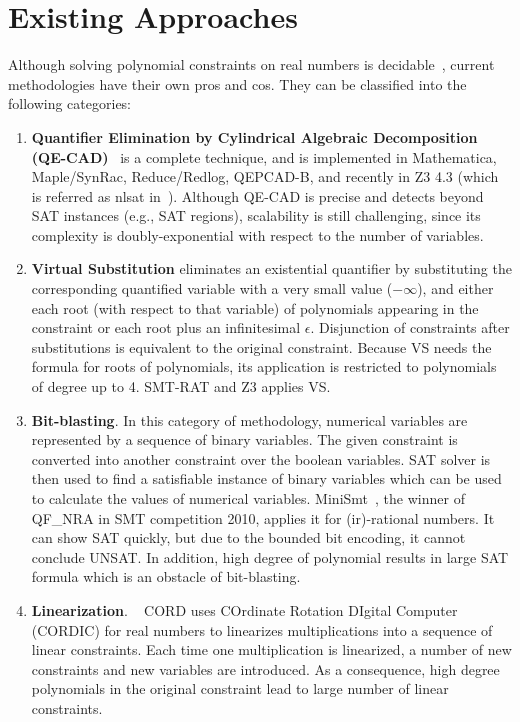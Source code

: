 \section{Existing Approaches}
Although solving polynomial constraints on real numbers is decidable~\cite{tarski}, current methodologies have their own pros and cos. They can be classified into the following categories: 
\begin{enumerate}
\item \textbf{Quantifier Elimination by Cylindrical Algebraic Decomposition (QE-CAD)}~\cite{qecad} 
is a complete technique, and 
is implemented in Mathematica, Maple/SynRac, Reduce/Redlog, QEPCAD-B, and recently 
in
Z3 4.3 (which is referred as nlsat in~\cite{Jovanovic13}).
Although QE-CAD is precise and detects beyond SAT instances (e.g., SAT regions), 
scalability is still challenging, since its complexity is doubly-exponential with respect to the number of variables. 

\item \textbf{Virtual Substitution } eliminates an existential quantifier by substituting the corresponding quantified variable with a very small value ($-\infty$), and either each root (with respect to that variable) of polynomials appearing in the constraint or each root plus an infinitesimal $\epsilon$. Disjunction of constraints after substitutions is equivalent to the original constraint. Because VS needs the formula for roots of polynomials, its application is restricted to polynomials of degree up to 4. SMT-RAT and  
Z3 \cite{PBM12} applies VS.

\item \textbf{Bit-blasting}. 
In this category of methodology, numerical variables are represented by a sequence of binary variables. The given constraint is converted into another constraint over the boolean variables. SAT solver is then used to find a satisfiable instance of binary variables which can be used to calculate the values of numerical variables.  MiniSmt~\cite{Zankl:2010:SNR:1939141.1939168}, the winner of QF\_NRA in SMT competition 2010, 
applies it for (ir)-rational numbers.
It can show SAT quickly, but due to the bounded bit encoding, 
it cannot conclude UNSAT. In addition, high degree of polynomial results in large SAT formula which is an obstacle of bit-blasting.

\item \textbf{Linearization}. ~
CORD \cite{cordic} uses COrdinate Rotation DIgital Computer (CORDIC) for real numbers to linearizes multiplications into a sequence of linear constraints. Each time one multiplication is linearized, a number of new constraints and new variables are introduced. As a consequence, high degree polynomials in the original constraint lead to large number of linear constraints. 


\end{enumerate}
